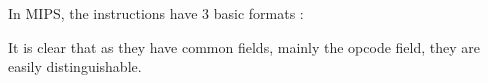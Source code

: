 In MIPS, the instructions have 3 basic formats
:
\begin{figure}[ht]
\centering
{}
\label{fig:instruction_formats}
\end{figure}

It is clear that as they have common fields, mainly the opcode field, they are
easily distinguishable.


